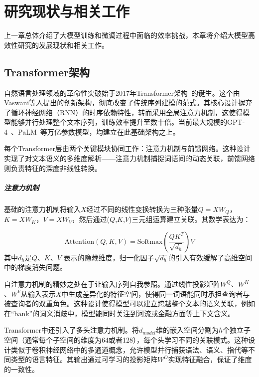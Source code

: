 
\chapter{研究现状与相关工作}

上一章总体介绍了大模型训练和微调过程中面临的效率挑战，本章将介绍大模型高效性研究的发展现状和相关工作。


\section{Transformer架构}
自然语言处理领域的革命性突破始于2017年Transformer架构~\cite{Vaswani+2017}的诞生。这个由Vaswani等人提出的创新架构，彻底改变了传统序列建模的范式。其核心设计摒弃了循环神经网络（RNN）的时序依赖特性，转而采用全局注意力机制，这使得模型能够并行处理整个文本序列，训练效率提升至数十倍。当前最大规模的GPT-4~\cite{openai2023gpt4}、PaLM~\cite{chowdhery2023palm}等万亿参数模型，均建立在此基础架构之上。


每个Transformer层由两个关键模块协同工作：注意力机制与前馈网络。这种设计实现了对文本语义的多维度解析——注意力机制捕捉词语间的动态关联，前馈网络则负责特征的深度非线性转换。

\paragraph{注意力机制}
基础的注意力机制将输入$X$经过不同的线性变换转换为三种张量$Q=XW_Q$，$K=XW_K$，$V=XW_V$，然后通过($Q$,$K$,$V$)三元组运算建立关联。其数学表达为：

\begin{equation}
    \text{Attention}(Q, K, V) = \text{Softmax}(\frac{QK^T}{\sqrt{d_h}})V
\end{equation}
其中$d_h$是$Q$、$K$、$V$ 表示的隐藏维度，归一化因子$\sqrt{d_h}$的引入有效缓解了高维空间中的梯度消失问题。

自注意力机制的精妙之处在于让输入序列自我参照。通过线性投影矩阵$W^Q$、$W^K$、$W^V$从输入表示$X$中生成差异化的特征空间，使得同一词语能同时承担查询者与被查询者的双重角色。这种设计使得模型可以建立跨越整个文本的语义关联，例如在“bank”的词义消歧中，模型能同时关注到河流或金融方面等上下文含义。

Transformer中还引入了多头注意力机制。将$d_{model}$维的嵌入空间分割为$h$个独立子空间（通常每个子空间的维度为64或者128），每个头学习不同的关联模式。这种设计类似于卷积神经网络中的多通道概念，允许模型并行捕获语法、语义、指代等不同类型的语言特征。其输出通过可学习的投影矩阵$W^O$实现特征融合，保证了维度的一致性。

